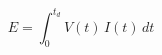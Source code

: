 \documentclass[preview]{standalone}
\begin{document}
\[E = \int_0^{t_d} V(t)\, I(t)\, dt \tag{3.3}\]
\end{document}
